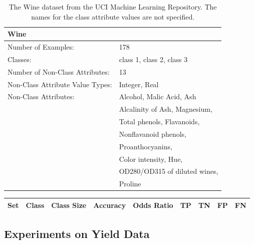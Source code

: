 \documentclass[11pt]{article}
\begin{document}
\begin{table}
\begin{tabularx}{\textwidth}{ll}
\toprule
\textbf{Wine} & \\
\midrule
Number of Examples: & 178 \\
Classes: & class 1, class 2, class 3 \\
Number of Non-Class Attributes: & 13 \\
Non-Class Attribute Value Types: & Integer, Real \\
Non-Class Attributes: & Alcohol, Malic Acid, Ash \\ & Alcalinity of Ash, Magnesium, \\
& Total phenols, Flavanoids, \\
& Nonflavanoid phenols, \\
& Proanthocyanins, \\
& Color intensity, Hue, \\
& OD280/OD315 of diluted wines, \\
& Proline \\
\bottomrule
\end{tabularx}
\caption{The Wine dataset from the UCI Machine Learning Repository. The names for the class attribute values are not specified.}
\label{wine_info}
\end{table}

\begin{table}
\centering
\begin{tabular}{lllllllll}
\toprule
Set & Class & Class Size & Accuracy & Odds Ratio & TP & TN & FP & FN \\
\midrule
\bottomrule
\end{tabular}
\label{iris_results}
\end{table}

\subsection{Experiments on Yield Data}
\end{document}
